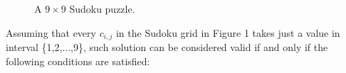 \documentclass[]{usiinfprospectus}
\newcounter{row}
\newcounter{col}
\newcommand\setrow[9]{
  \setcounter{col}{1}
  \foreach \n in {#1, #2, #3, #4, #5, #6, #7, #8, #9} {
    \edef\x{\value{col} - 0.5}
    \edef\y{9.5 - \value{row}}
    \node[anchor=center] at (\x, \y) {\n};
    \stepcounter{col}
  }
  \stepcounter{row}
}
\begin{document}
\begin{figure}[h]
\begin{center}
\end{center}
\caption{A $9\times 9$ Sudoku puzzle.}
\end{figure}
\noindent
Assuming that every $c_{i,j}$ in the Sudoku grid in Figure 1 takes just a value in interval \{1,2,...,9\}, such solution can be considered valid if and only if the following conditions are satisfied: 
\end{document}
